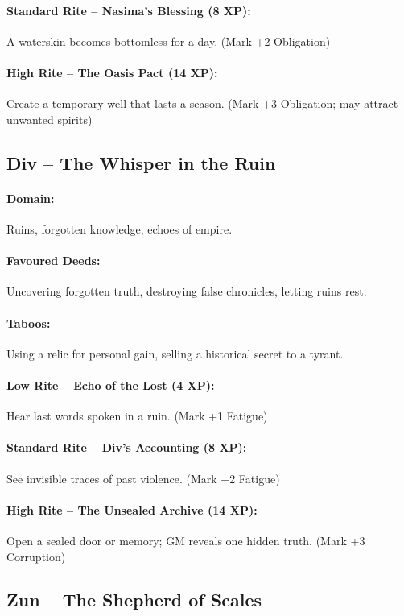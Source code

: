 \documentclass[11pt]{book}
\begin{document}
\paragraph{Standard Rite -- Nasima’s Blessing (8 XP):} A waterskin becomes bottomless for a day. (Mark +2 Obligation)
\paragraph{High Rite -- The Oasis Pact (14 XP):} Create a temporary well that lasts a season. (Mark +3 Obligation; may attract unwanted spirits)

\subsection{Div – The Whisper in the Ruin}
\paragraph{Domain:} Ruins, forgotten knowledge, echoes of empire.
\paragraph{Favoured Deeds:} Uncovering forgotten truth, destroying false chronicles, letting ruins rest.
\paragraph{Taboos:} Using a relic for personal gain, selling a historical secret to a tyrant.
\paragraph{Low Rite -- Echo of the Lost (4 XP):} Hear last words spoken in a ruin. (Mark +1 Fatigue)
\paragraph{Standard Rite -- Div’s Accounting (8 XP):} See invisible traces of past violence. (Mark +2 Fatigue)
\paragraph{High Rite -- The Unsealed Archive (14 XP):} Open a sealed door or memory; GM reveals one hidden truth. (Mark +3 Corruption)

\subsection{Zun – The Shepherd of Scales}
\end{document}
